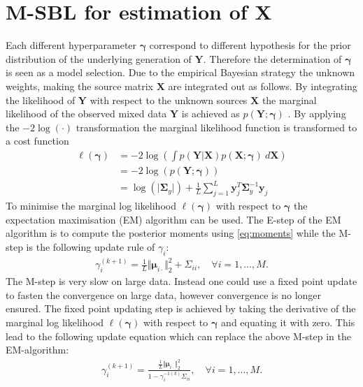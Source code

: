 \section{M-SBL for estimation of $\textbf{X}$}
Each different hyperparameter $\boldsymbol{\gamma}$ correspond to different hypothesis for the prior distribution of the underlying generation of $\mathbf{Y}$. Therefore the determination of $\boldsymbol{\gamma}$ is seen as a model selection.
Due to the empirical Bayesian strategy the unknown weights, making the source matrix $\textbf{X}$ are integrated out as follows.
By integrating the likelihood of $\textbf{Y}$ with respect to the unknown sources $\mathbf{X}$ the marginal likelihood of the observed mixed data $\mathbf{Y}$ is achieved as $p (\mathbf{Y} ; \boldsymbol{\gamma})$ \cite[p. 146]{phd_wipf}. 
By applying the $-2 \log (\cdot)$ transformation the marginal likelihood function is transformed to a cost function
\begin{align*}
\ell(\boldsymbol{\gamma}) &= -2 \log \left( \int p (\mathbf{Y}  \vert \mathbf{X}) p (\mathbf{X} ; \boldsymbol{\gamma}) \ d\mathbf{X} \right) \\
&= - 2 \log(p (\mathbf{Y} ; \boldsymbol{\gamma}))\\
&= \log ( \vert \boldsymbol{\Sigma}_y \vert) + \frac{1}{L} \sum_{j=1}^L \mathbf{y}_{j}^T \boldsymbol{\Sigma}_y ^{-1} \mathbf{y}_{j}
\end{align*}
To minimise the marginal log likelihood $\ell(\boldsymbol{\gamma})$ with respect to $\boldsymbol{\gamma}$ the expectation maximisation (EM)  algorithm can be used. 
The E-step of the EM algorithm is to compute the posterior moments using \eqref{eq:moments} while the M-step is the following update rule of $\gamma_i$:
\begin{align*}
\gamma_i^{(k+1)} = \frac{1}{L} \Vert \boldsymbol{\mu}_{i \cdot} \Vert_2^2 + \Sigma_{ii}, \quad \forall i = 1, \dots, M.
\end{align*}
The M-step is very slow on large data. 
Instead one could use a fixed point update to fasten the convergence on large data, however convergence is no longer ensured. 
The fixed point updating step is achieved by taking the derivative of the marginal log likelihood $\ell(\boldsymbol{\gamma})$ with respect to $\boldsymbol{\gamma}$ and equating it with zero. 
This lead to the following update equation which can replace the above M-step in the EM-algorithm:
\begin{align*}
\gamma_i^{(k+1)} = \frac{\frac{1}{L} \Vert \boldsymbol{\mu}_{i \cdot} \Vert_2^2}{1 - \gamma_i^{-1 (k)} \Sigma_{ii}}, \quad \forall i = 1, \dots, M.
\end{align*}
